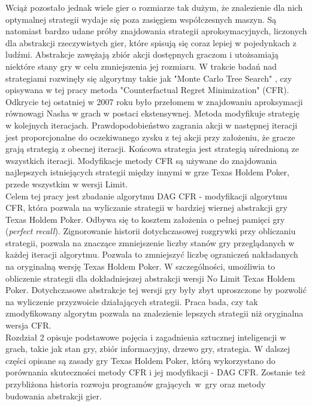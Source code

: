 \documentclass[magisterska]{pracamgr}
\begin{document}
\noindent
Wciąż pozostało jednak wiele gier o rozmiarze tak dużym, że znalezienie dla nich optymalnej strategii wydaje
się poza zasięgiem współczesnych maszyn. Są natomiast bardzo udane próby znajdowania strategii aproksymacyjnych,
liczonych dla abstrakcji rzeczywistych gier, które spisują się coraz lepiej w pojedynkach z ludźmi.
Abstrakcje zawężają zbiór akcji dostępnych graczom i utożsamiają niektóre stany gry w celu zmniejszenia jej rozmiaru.
W trakcie badań nad strategiami rozwinęły się algorytmy takie jak "Monte Carlo Tree Search" \cite{monte-carlo-survey}, czy opisywana
w tej pracy metoda "Counterfactual Regret Minimization" (CFR). Odkrycie tej ostatniej w 2007 roku \cite{cfr} było przełomem
w znajdowaniu aproksymacji równowagi Nasha w grach w postaci ekstensywnej. Metoda modyfikuje strategię w kolejnych iteracjach.
Prawdopodobieństwo zagrania akcji w następnej iteracji jest proporcjonalne do oczekiwanego zysku z tej akcji
przy założeniu, że gracze grają strategią z obecnej iteracji. Końcowa strategia jest strategią uśrednioną ze wszystkich iteracji.
Modyfikacje metody CFR są używane do znajdowania najlepszych istniejących strategii między innymi w grze Texas Holdem Poker, przede
wszystkim  w wersji Limit. \\

\noindent
Celem tej pracy jest zbadanie algorytmu DAG CFR - modyfikacji algorytmu CFR, która pozwala na wyliczanie strategii w bardziej wiernej
abstrakcji gry Texas Holdem Poker. Odbywa się to kosztem założenia o pełnej pamięci gry (\emph{perfect recall}).
Zignorowanie historii dotychczasowej rozgrywki przy obliczaniu strategii, pozwala na znaczące zmniejszenie liczby
stanów gry przeglądanych w każdej iteracji algorytmu. Pozwala to zmniejszyć liczbę ograniczeń nakładanych
na oryginalną wersję Texas Holdem Poker. W szczególności, umożliwia to obliczenie strategii dla dokładniejszej abstrakcji
wersji No Limit Texas Holdem Poker. Dotychczasowe abstrakcje tej wersji gry były zbyt uproszczone by pozwolić na
wyliczenie przyzwoicie działających strategii. Praca bada, czy tak zmodyfikowany algorytm pozwala na znalezienie
lepszych strategii niż oryginalna wersja CFR. \\

\noindent
Rozdział 2 opisuje podstawowe pojęcia i zagadnienia sztucznej inteligencji w grach, takie jak
stan gry, zbiór informacyjny, drzewo gry, strategia. W dalszej części opisane są zasady gry
Texas Holdem Poker, którą wykorzystano do porównania skuteczności metody CFR i jej modyfikacji - DAG CFR.
Zostanie też przybliżona historia rozwoju programów grających~w~gry oraz metody budowania abstrakcji gier. \\
\end{document}
